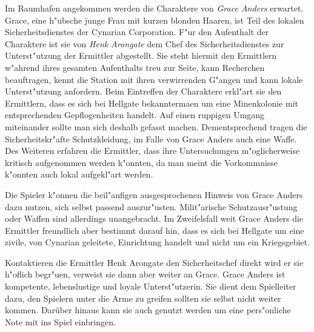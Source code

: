 Im Raumhafen angekommen werden die Charaktere von \emph{Grace Anders} erwartet. Grace, eine h"ubsche junge Frau mit kurzen blonden Haaren, ist Teil des lokalen Sicherheitsdienstes der Cynarian Corporation. F"ur den Aufenthalt der Charaktere ist sie von \emph{Henk Arongate} dem Chef des Sicherheitsdienstes zur Unterst"utzung der Ermittler abgestellt. Sie steht hiermit den Ermittlern w"ahrend ihres gesamten Aufenthalts treu zur Seite, kann Recherchen beauftragen, kennt die Station mit ihren verwirrenden G"angen und kann lokale Unterst"utzung anfordern. Beim Eintreffen der Charaktere erkl"art sie den Ermittlern, dass es sich bei Hellgate bekannterma\3en um eine Minenkolonie mit entsprechenden Gepflogenheiten handelt. Auf einen ruppigen Umgang miteinander sollte man sich deshalb gefasst machen. Dementsprechend tragen die Sicherheitskr"afte Schutzkleidung, im Falle von Grace Anders auch eine Waffe. Des Weiteren erfahren die Ermittler, dass ihre Untersuchungen m"oglicherweise kritisch aufgenommen werden k"onnten, da man meint die Vorkommnisse k"onnten auch lokal aufgekl"art werden.


\begin{remarks}
	Die Spieler k"onnen die beil"aufigen ausgesprochenen Hinweis von Grace Anders dazu nutzen, sich selbst passend auszur"usten. Milit"arische Schutzausr"ustung oder Waffen sind allerdings unangebracht. Im Zweifelsfall wei\3t Grace Anders die Ermittler freundlich aber bestimmt darauf hin, dass es sich bei Hellgate um eine zivile, von Cynarian geleitete, Einrichtung handelt und nicht um ein Kriegsgebiet. 
	
	Kontaktieren die Ermittler Henk Arongate den Sicherheitschef direkt wird er sie h"oflich begr"u\3en, verweist sie dann aber weiter an Grace. Grace Anders ist kompetente, lebenslustige und loyale Unterst"utzerin. Sie dient dem Spielleiter dazu, den Spielern unter die Arme zu greifen sollten sie selbst nicht weiter kommen. Darüber hinaus kann sie auch genutzt werden um eine pers"onliche Note mit ins Spiel einbringen.
\end{remarks}


